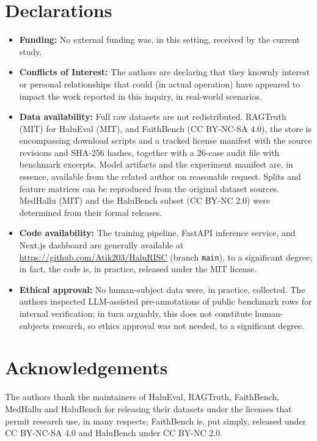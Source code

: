 \documentclass[a4paper,fleqn]{cas-sc}
\begin{document}
\section*{Declarations}
\begin{itemize}
  \setlength{\itemsep}{0pt}
  \setlength{\parsep}{0pt}
  \item \textbf{Funding:} No external funding was, in this setting, received by the current study.

  \item \textbf{Conflicts of Interest:} The authors are declaring that they knownly interest or personal relationships that could (in actual operation) have appeared to impact the work reported in this inquiry, in real-world scenarios.

  \item \textbf{Data availability:} Full raw datasets are not redistributed. RAGTruth (MIT) for HaluEval (MIT), and FaithBench (CC BY-NC-SA 4.0), the store is encompassing download scripts and a tracked license manifest with the source revisions and SHA-256 hashes, together with a 26-case audit file with benchmark excerpts. Model artifacts and the experiment manifest are, in essence, available from the related author on reasonable request. Splits and feature matrices can be reproduced from the original dataset sources. MedHallu (MIT) and the HaluBench subset (CC BY-NC 2.0) were determined from their formal releases.

  \item \textbf{Code availability:} The training pipeline, FastAPI inference service, and Next.js dashboard are generally available at \url{https://github.com/Atik203/HaluRISC} (branch \texttt{main}), to a significant degree; in fact, the code is, in practice, released under the MIT license.

  \item \textbf{Ethical approval:} No human-subject data were, in practice, collected. The authors inspected LLM-assisted pre-annotations of public benchmark rows for internal verification; in turn arguably, this does not constitute human-subjects research, so ethics approval was not needed, to a significant degree.
\end{itemize}


\section*{Acknowledgements}
The authors thank the maintainers of HaluEval, RAGTruth, FaithBench, MedHallu and HaluBench for releasing their datasets under the licenses that permit research use, in many respects; FaithBench is, put simply, released under CC BY-NC-SA 4.0 and HaluBench under CC BY-NC 2.0.

\sloppy
\setlength{\bibsep}{0pt}
\renewcommand{\bibfont}{\fontsize{8.5pt}{9pt}\selectfont}



\vspace{4pt}
\end{document}
